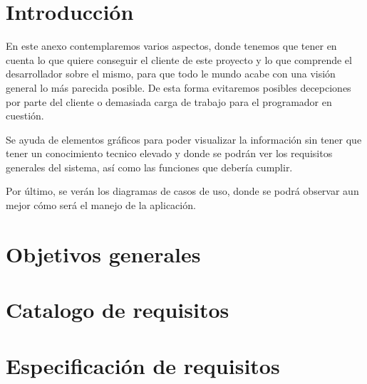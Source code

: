 
\section{Introducción}

En este anexo contemplaremos varios aspectos, donde tenemos que tener en cuenta lo que quiere conseguir el cliente de este proyecto y lo que comprende el desarrollador sobre el mismo, para que todo le mundo acabe con una visión general lo más parecida posible. De esta forma evitaremos posibles decepciones por parte del cliente o demasiada carga de trabajo para el programador en cuestión.

Se ayuda de elementos gráficos para poder visualizar la información sin tener que tener un conocimiento tecnico elevado y donde se podrán ver los requisitos generales del sistema, así como las funciones que debería cumplir.

Por último, se verán los diagramas de casos de uso, donde se podrá observar aun mejor cómo será el manejo de la aplicación.

\section{Objetivos generales}

\section{Catalogo de requisitos}

\section{Especificación de requisitos}


